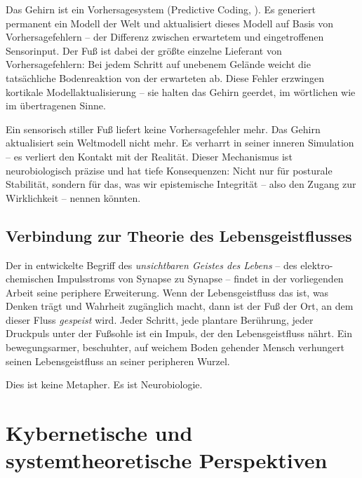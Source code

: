 ﻿\documentclass[12pt,a4paper]{report}
\theoremstyle{plain}
\theoremstyle{definition}
\theoremstyle{remark}
\begin{document}
Das Gehirn ist ein Vorhersagesystem (Predictive Coding,
\cite{friston2010}). Es generiert permanent ein Modell der Welt
und aktualisiert dieses Modell auf Basis von Vorhersagefehlern --
der Differenz zwischen erwartetem und eingetroffenen Sensorinput.
Der Fuß ist dabei der größte einzelne Lieferant von
Vorhersagefehlern: Bei jedem Schritt auf unebenem Gelände
weicht die tatsächliche Bodenreaktion von der erwarteten ab.
Diese Fehler erzwingen kortikale Modellaktualisierung --
sie halten das Gehirn geerdet, im wörtlichen wie im übertragenen
Sinne.

Ein sensorisch stiller Fuß liefert keine Vorhersagefehler mehr.
Das Gehirn aktualisiert sein Weltmodell nicht mehr. Es verharrt
in seiner inneren Simulation -- es verliert den Kontakt mit der
Realität. Dieser Mechanismus ist neurobiologisch präzise
und hat tiefe Konsequenzen: Nicht nur für posturale Stabilität,
sondern für das, was wir epistemische Integrität -- also den
Zugang zur Wirklichkeit -- nennen könnten.

\subsection{Verbindung zur Theorie des Lebensgeistflusses}

Der in \cite{epp2026brn} entwickelte Begriff des
\emph{unsichtbaren Geistes des Lebens} -- des elektro-chemischen
Impulsstroms von Synapse zu Synapse -- findet in der vorliegenden
Arbeit seine periphere Erweiterung. Wenn der Lebensgeistfluss das
ist, was Denken trägt und Wahrheit zugänglich macht, dann ist der
Fuß der Ort, an dem dieser Fluss \emph{gespeist} wird. Jeder
Schritt, jede plantare Berührung, jeder Druckpuls unter der
Fußsohle ist ein Impuls, der den Lebensgeistfluss nährt. Ein
bewegungsarmer, beschuhter, auf weichem Boden gehender Mensch
verhungert seinen Lebensgeistfluss an seiner peripheren Wurzel.

Dies ist keine Metapher. Es ist Neurobiologie.

\section{Kybernetische und systemtheoretische Perspektiven}
\end{document}
